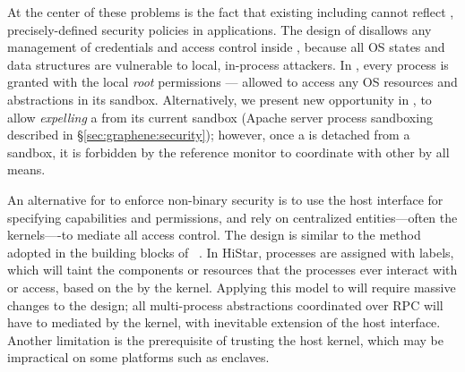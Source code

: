At the center of these problems is the fact that existing \liboses{} including \graphene{}
cannot reflect ,
precisely-defined security policies in applications.
The design of \picoprocs{} disallows any management of credentials and access control inside \liboses{},
because all OS states and data structures are
vulnerable to local, in-process attackers. %
In \graphene{}, every process is granted with the local \emph{root} permissions
--- allowed to access any OS resources and abstractions
in its sandbox.
Alternatively, we present new opportunity in \graphene{},
to allow \emph{expelling} a \picoproc{} from its current sandbox (Apache server process sandboxing described in \S\ref{sec:graphene:security});
however, once a \picoproc{} is detached from a sandbox,
it is forbidden by the reference monitor to coordinate with other \picoprocs{}
by all means.




An alternative for \picoprocs{} to enforce non-binary security
is to use the host interface
for specifying capabilities and permissions,
and rely on centralized entities---often the kernels----to mediate all 
access control.
The design is similar to the method adopted in the building blocks of ~\citep{zeldovich+histar}.
In HiStar, processes are assigned with labels, which will taint the components or resources that the processes ever interact with or access,
based on the  by the kernel.
Applying this model to \graphene{} will require
massive changes to the design;
all multi-process abstractions coordinated over RPC will have to mediated by the kernel, with inevitable extension of the host interface.
Another limitation is the prerequisite of
trusting the host kernel,
which may be impractical on some platforms such as \sgx{} enclaves.

